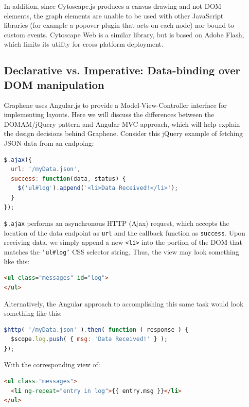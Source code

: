 In addition, since Cytoscape.js produces a canvas drawing and not DOM elements, the graph elements are unable to be used with other JavaScript libraries (for example a popover plugin that acts on each node) nor bound to custom events.
Cytoscape Web \autocite{cytoscape2014web} is a similar library, but is based on Adobe Flash, which limits its utility for cross platform deployment.

\subsection{Declarative vs. Imperative: Data-binding over DOM manipulation}
\label{sec:declarative-vs-imperative}

Graphene uses Angular.js \autocite{google2014angular} to provide a Model-View-Controller \autocite{krasner1988description} interface for implementing layouts.
Here we will discuss the differences between the DOMAM/jQuery pattern and Angular MVC approach, which will help explain the design decisions behind Graphene.
Consider this jQuery example of fetching JSON data from an endpoing:

\begin{lstlisting}[language=JavaScript]
$.ajax({
  url: '/myData.json',
  success: function(data, status) {
    $('ul#log').append('<li>Data Received!</li>');
  }
});
\end{lstlisting}

\texttt{\$.ajax} performs an asynchronous HTTP (Ajax) request, which accepts the location of the data endpoint as \texttt{url} and the callback function as \texttt{success}.
Upon receiving data, we simply append a new \texttt{<li>} into the portion of the DOM that matches the \texttt{'ul\#log'} CSS selector string.
Thus, the view may look something like this:

\begin{lstlisting}[language=html]
<ul class="messages" id="log">
</ul>
\end{lstlisting}

Alternatively, the Angular approach to accomplishing this same task would look something like this:

\begin{lstlisting}[language=JavaScript]
$http( '/myData.json' ).then( function ( response ) {
  $scope.log.push( { msg: 'Data Received!' } );
});
\end{lstlisting}

With the corresponding view of:

\begin{lstlisting}[language=html]
<ul class="messages">
  <li ng-repeat="entry in log">{{ entry.msg }}</li>
</ul>
\end{lstlisting}

